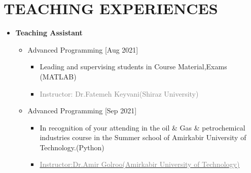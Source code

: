 \documentclass[10pt,a4paper,sans]{moderncv} %
\begin{document}
	\vspace{-1.8em}
	
	
	
	
	\section{TEACHING EXPERIENCES}
	\begin{itemize}
		\item \textbf{Teaching Assistant}    
		\vspace{0.5em}
		\begin{itemize}
			\item {} Advanced Programming   \hfill[Aug 2021]
			\begin{itemize} 
    				\item Leading and supervising students in Course Material,Exams (MATLAB)
				\item\textcolor{gray}{Instructor: Dr.Fatemeh Keyvani(Shiraz University)}
			\end{itemize}
	 		
				\newline
			
		
	\end{itemize}
	
	\vspace{0.5em}
	
	\begin{itemize}
			\item {}  Advanced Programming  \hfill[Sep 2021]
			\begin{itemize} 
				\item In recognition of your attending in the oil \& Gas \& petrochemical industries course in the Summer school of Amirkabir University of Technology.(Python)
				\item\href{https://aut.ac.ir/cv/2035/amir-golroo?slc_lang=en&&cv=2035&mod=scv}{\textcolor{gray}{Instructor:Dr.Amir Golroo(Amirkabir University of Technology)}}
			\end{itemize}
				\newline
	

\end{itemize}
\end{itemize}
\end{document}

